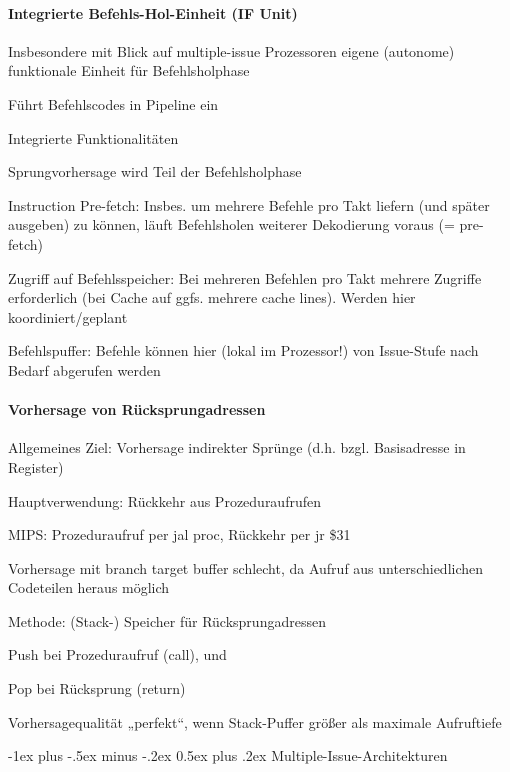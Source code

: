 \documentclass[10pt,landscape]{article}
\makeatletter
\renewcommand{\section}{\@startsection{section}{1}{0mm}%
                                {-1ex plus -.5ex minus -.2ex}%
                                {0.5ex plus .2ex}%
                                {\normalfont\large\bfseries}}
\makeatother
\begin{document}
\begin{multicols}{3}
  \paragraph{ Integrierte Befehls-Hol-Einheit (IF Unit)}
  Insbesondere mit Blick auf multiple-issue Prozessoren eigene (autonome) funktionale Einheit für Befehlsholphase
  \begin{itemize*}
    \item Führt Befehlscodes in Pipeline ein
    \item Integrierte Funktionalitäten
    \item Sprungvorhersage wird Teil der Befehlsholphase
    \item Instruction Pre-fetch: Insbes. um mehrere Befehle pro Takt liefern (und später ausgeben) zu können, läuft Befehlsholen weiterer Dekodierung voraus (= pre-fetch)
    \item Zugriff auf Befehlsspeicher: Bei mehreren Befehlen pro Takt mehrere Zugriffe erforderlich (bei Cache auf ggfs. mehrere cache lines). Werden hier koordiniert/geplant
    \item Befehlspuffer: Befehle können hier (lokal im Prozessor!) von Issue-Stufe nach Bedarf abgerufen werden
  \end{itemize*}
  
  \paragraph{ Vorhersage von Rücksprungadressen}
  Allgemeines Ziel: Vorhersage indirekter Sprünge (d.h. bzgl. Basisadresse in Register)
  \begin{itemize*}
    \item Hauptverwendung: Rückkehr aus Prozeduraufrufen
    \item MIPS: Prozeduraufruf per jal proc, Rückkehr per jr \$31
    \item Vorhersage mit branch target buffer schlecht, da Aufruf aus unterschiedlichen Codeteilen heraus möglich
    \item Methode: (Stack-) Speicher für Rücksprungadressen
    \item Push bei Prozeduraufruf (call), und
    \item Pop bei Rücksprung (return)
    \item Vorhersagequalität „perfekt“, wenn Stack-Puffer größer als maximale Aufruftiefe
  \end{itemize*}
  
  \section{ Multiple-Issue-Architekturen}

\end{multicols}
\end{document}
